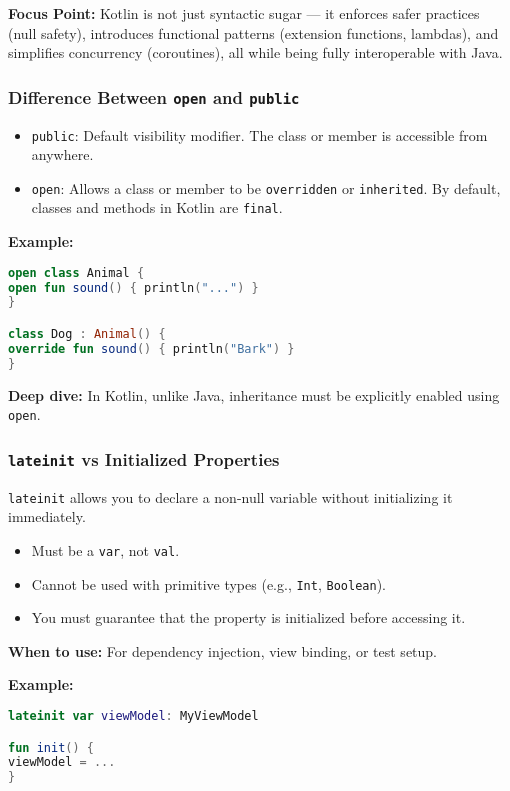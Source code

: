 \documentclass[a4paper,12pt]{article}
\begin{document}
\textbf{Focus Point:} Kotlin is not just syntactic sugar — it enforces safer practices (null safety), introduces functional patterns (extension functions, lambdas), and simplifies concurrency (coroutines), all while being fully interoperable with Java.

\subsubsection{Difference Between \texttt{open} and \texttt{public}}

\begin{itemize}
\item \texttt{public}: Default visibility modifier. The class or member is accessible from anywhere.
\item \texttt{open}: Allows a class or member to be \texttt{overridden} or \texttt{inherited}. By default, classes and methods in Kotlin are \texttt{final}.
\end{itemize}

\textbf{Example:}
\begin{lstlisting}[language=Kotlin]
open class Animal {
open fun sound() { println("...") }
}

class Dog : Animal() {
override fun sound() { println("Bark") }
}
\end{lstlisting}

\textbf{Deep dive:} In Kotlin, unlike Java, inheritance must be explicitly enabled using \texttt{open}.

\subsubsection{\texttt{lateinit} vs Initialized Properties}

\texttt{lateinit} allows you to declare a non-null variable without initializing it immediately.

\begin{itemize}
\item Must be a \texttt{var}, not \texttt{val}.
\item Cannot be used with primitive types (e.g., \texttt{Int}, \texttt{Boolean}).
\item You must guarantee that the property is initialized before accessing it.
\end{itemize}

\textbf{When to use:} For dependency injection, view binding, or test setup.

\textbf{Example:}
\begin{lstlisting}[language=Kotlin]
lateinit var viewModel: MyViewModel

fun init() {
viewModel = ...
}
\end{lstlisting}
\end{document}
